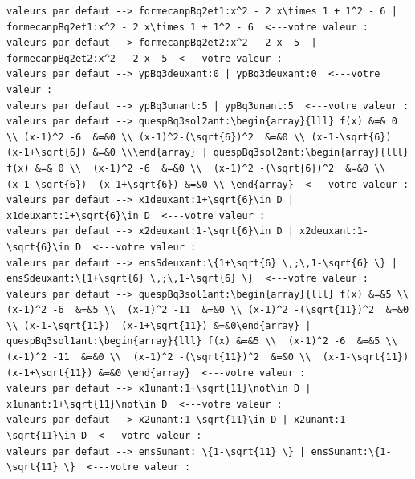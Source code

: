 {{\begin{verbatim}
valeurs par defaut --> formecanpBq2et1:x^2 - 2 x\times 1 + 1^2 - 6 | formecanpBq2et1:x^2 - 2 x\times 1 + 1^2 - 6  <---votre valeur : 
valeurs par defaut --> formecanpBq2et2:x^2 - 2 x -5  | formecanpBq2et2:x^2 - 2 x -5  <---votre valeur : 
valeurs par defaut --> ypBq3deuxant:0 | ypBq3deuxant:0  <---votre valeur : 
valeurs par defaut --> ypBq3unant:5 | ypBq3unant:5  <---votre valeur : 
valeurs par defaut --> quespBq3sol2ant:\begin{array}{lll} f(x) &=& 0 \\ (x-1)^2 -6  &=&0 \\ (x-1)^2-(\sqrt{6})^2  &=&0 \\ (x-1-\sqrt{6})  (x-1+\sqrt{6}) &=&0 \\\end{array} | quespBq3sol2ant:\begin{array}{lll}  f(x) &=& 0 \\  (x-1)^2 -6  &=&0 \\  (x-1)^2 -(\sqrt{6})^2  &=&0 \\  (x-1-\sqrt{6})  (x-1+\sqrt{6}) &=&0 \\ \end{array}  <---votre valeur : 
valeurs par defaut --> x1deuxant:1+\sqrt{6}\in D | x1deuxant:1+\sqrt{6}\in D  <---votre valeur : 
valeurs par defaut --> x2deuxant:1-\sqrt{6}\in D | x2deuxant:1-\sqrt{6}\in D  <---votre valeur : 
valeurs par defaut --> ensSdeuxant:\{1+\sqrt{6} \,;\,1-\sqrt{6} \} | ensSdeuxant:\{1+\sqrt{6} \,;\,1-\sqrt{6} \}  <---votre valeur : 
valeurs par defaut --> quespBq3sol1ant:\begin{array}{lll} f(x) &=&5 \\ (x-1)^2 -6  &=&5 \\  (x-1)^2 -11  &=&0 \\ (x-1)^2 -(\sqrt{11})^2  &=&0 \\ (x-1-\sqrt{11})  (x-1+\sqrt{11}) &=&0\end{array} | quespBq3sol1ant:\begin{array}{lll} f(x) &=&5 \\  (x-1)^2 -6  &=&5 \\   (x-1)^2 -11  &=&0 \\  (x-1)^2 -(\sqrt{11})^2  &=&0 \\  (x-1-\sqrt{11})  (x-1+\sqrt{11}) &=&0 \end{array}  <---votre valeur : 
valeurs par defaut --> x1unant:1+\sqrt{11}\not\in D | x1unant:1+\sqrt{11}\not\in D  <---votre valeur : 
valeurs par defaut --> x2unant:1-\sqrt{11}\in D | x2unant:1-\sqrt{11}\in D  <---votre valeur : 
valeurs par defaut --> ensSunant: \{1-\sqrt{11} \} | ensSunant:\{1-\sqrt{11} \}  <---votre valeur : 
\end{verbatim}
}

}
